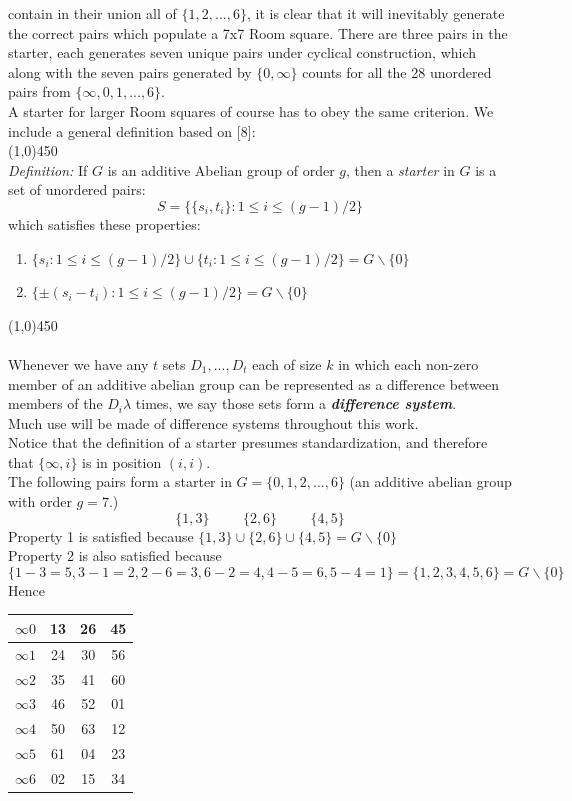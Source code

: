 \documentclass[
  12pt,
  a4paper]{book}
\begin{document}
contain in their union all of \(\{1,2,...,6\}\), it is clear that it will
inevitably generate the correct pairs which populate a 7x7 Room square.
There are three pairs in the starter, each generates seven unique pairs
under cyclical construction, which along with the seven pairs generated
by \(\{0,\infty\}\) counts for all the 28 unordered pairs from
\(\{\infty,0,1,...,6\}\).\\
A starter for larger Room squares of course has to obey the same
criterion. We include a general definition based on {[}8{]}:\\
(1,0){450}\\
\emph{Definition:} If \(G\) is an additive Abelian group of order \(g\), then a
\emph{starter} in \(G\) is a set of unordered pairs:
\[S=\{\{s_i,t_i\}:1 \leq i \leq (g-1)/2\}\] which satisfies these
properties:

\begin{enumerate}
\def\labelenumi{\arabic{enumi}.}
\item
  \(\{s_i:1 \leq i \leq (g-1)/2\} \cup \{t_i : 1 \leq i \leq (g-1)/2\} = G \backslash \{0\}\)
\item
  \(\{\pm (s_i - t_i ) : 1 \leq i \leq (g-1)/2 \} = G \backslash \{0\}\)
\end{enumerate}

(1,0){450}\\
~\\
Whenever we have any \(t\) sets \(D_1,...,D_t\) each of size \(k\) in which
each non-zero member of an additive abelian group can be represented as
a difference between members of the \(D_i \lambda\) times, we say those
sets form a \textbf{\emph{difference system}}.\\
Much use will be made of difference systems throughout this work.\\
Notice that the definition of a starter presumes standardization, and
therefore that \(\{\infty,i\}\) is in position \((i,i)\).\\
The following pairs form a starter in \(G=\{0,1,2,...,6\}\) (an additive
abelian group with order \(g=7\).)
\[\{1,3\} \hspace{1cm} \{2,6\} \hspace{1cm} \{4,5\}\] Property 1 is
satisfied because
\(\{1,3\} \cup \{2,6\} \cup \{4,5\} = G \backslash \{0\}\)\\
Property 2 is also satisfied because
\[\{1-3=5,3-1=2,2-6=3,6-2=4,4-5=6,5-4=1\}=\{1,2,3,4,5,6\}=G\backslash \{0\}\]
Hence

\begin{longtable}[]{@{}cccc@{}}
\toprule
\(\infty 0\) & 13 & 26 & 45\tabularnewline
\midrule
\endhead
\(\infty 1\) & 24 & 30 & 56\tabularnewline
\(\infty 2\) & 35 & 41 & 60\tabularnewline
\(\infty 3\) & 46 & 52 & 01\tabularnewline
\(\infty 4\) & 50 & 63 & 12\tabularnewline
\(\infty 5\) & 61 & 04 & 23\tabularnewline
\(\infty 6\) & 02 & 15 & 34\tabularnewline
\bottomrule
\end{longtable}
\end{document}
